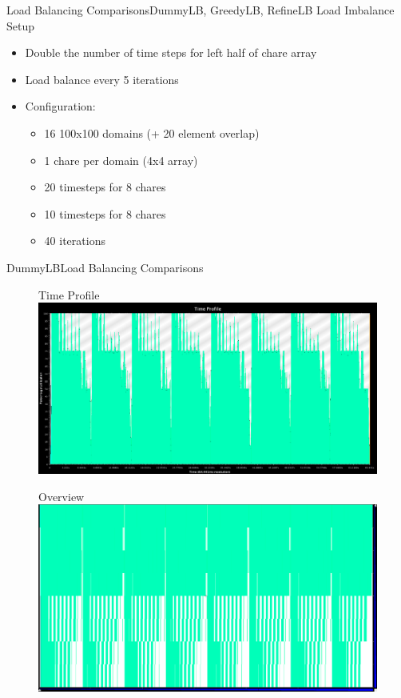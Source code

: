 \documentclass[]{beamer}
\begin{document}
\begin{frame}{Load Balancing Comparisons}{DummyLB, GreedyLB, RefineLB}
  Load Imbalance Setup
  \begin{itemize}
  \item Double the number of time steps for left half of chare array
  \item Load balance every 5 iterations
  \item Configuration:
    \begin{itemize}
    \item 16 100x100 domains (+ 20 element overlap)
    \item 1 chare per domain (4x4 array)
    \item 20 timesteps for 8 chares
    \item 10 timesteps for 8 chares
    \item 40 iterations
    \end{itemize}
  \end{itemize}
\end{frame}

\begin{frame}{DummyLB}{Load Balancing Comparisons}
  \begin{figure}{Time Profile}
    \includegraphics[width=.65\paperwidth,height=.35\paperheight]{figures/LoadBalancing/TimeProfileDummyLB}
  \end{figure}
  \begin{figure}{\hspace{15pt}Overview}
    \includegraphics[width=.65\paperwidth,height=.35\paperheight]{figures/LoadBalancing/OverviewDummyLB}
  \end{figure}
\end{frame}
\end{document}
